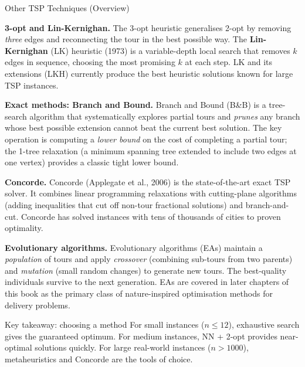 \documentclass[aspectratio=169,10pt]{beamer}
\begin{document}
\begin{frame}[allowframebreaks]{Other TSP Techniques (Overview)}

  \textbf{3-opt and Lin-Kernighan.}
  The 3-opt heuristic generalises 2-opt by removing \emph{three} edges
  and reconnecting the tour in the best possible way.  The
  \textbf{Lin-Kernighan} (LK) heuristic (1973) is a variable-depth
  local search that removes $k$ edges in sequence, choosing the most
  promising $k$ at each step.  LK and its extensions (LKH) currently
  produce the best heuristic solutions known for large TSP instances.

  \medskip
  \textbf{Exact methods: Branch and Bound.}
  Branch and Bound (B\&B) is a tree-search algorithm that systematically
  explores partial tours and \emph{prunes} any branch whose best
  possible extension cannot beat the current best solution.  The key
  operation is computing a \emph{lower bound} on the cost of completing
  a partial tour; the 1-tree relaxation (a minimum spanning tree
  extended to include two edges at one vertex) provides a classic tight
  lower bound.

  \medskip
  \textbf{Concorde.}
  Concorde (Applegate et al., 2006) is the state-of-the-art exact TSP
  solver.  It combines linear programming relaxations with cutting-plane
  algorithms (adding inequalities that cut off non-tour fractional
  solutions) and branch-and-cut.  Concorde has solved instances with
  tens of thousands of cities to proven optimality.

  \medskip
  \textbf{Evolutionary algorithms.}
  Evolutionary algorithms (EAs) maintain a \emph{population} of tours
  and apply \emph{crossover} (combining sub-tours from two parents) and
  \emph{mutation} (small random changes) to generate new tours.  The
  best-quality individuals survive to the next generation.  EAs are
  covered in later chapters of this book as the primary class of
  nature-inspired optimisation methods for delivery problems.

  \begin{alertblock}{Key takeaway: choosing a method}
    For small instances ($n \leq 12$), exhaustive search gives the
    guaranteed optimum.  For medium instances, NN + 2-opt provides
    near-optimal solutions quickly.  For large real-world instances
    ($n > 1000$), metaheuristics and Concorde are the tools of choice.
  \end{alertblock}

\end{frame}
\end{document}
